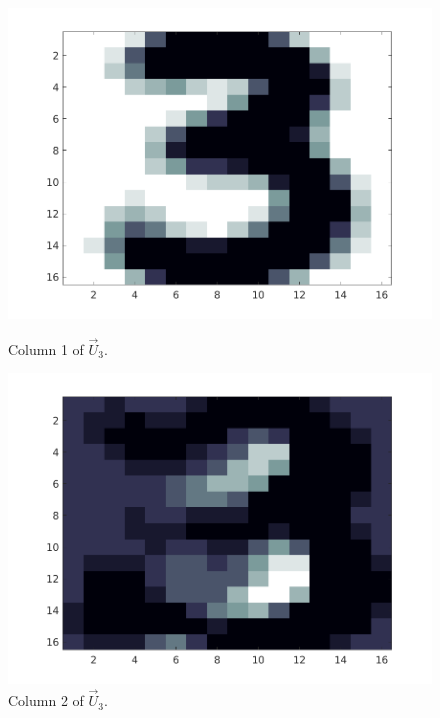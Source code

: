 \begin{figure}[H]
    \centering
    \begin{minipage}{0.3\textwidth}
        \includegraphics[width = \textwidth]{images/svd/U1.png}
        \caption{Column 1 of \(\vec{U}_3\).}\label{fig:svd_u1}
    \end{minipage}
    \begin{minipage}{0.3\textwidth}
        \includegraphics[width = \textwidth]{images/svd/U2.png}
        \caption{Column 2 of \(\vec{U}_3\).}\label{fig:svd_u2}
    \end{minipage}
    \begin{minipage}{0.3\textwidth}

\end{minipage}
\end{figure}
